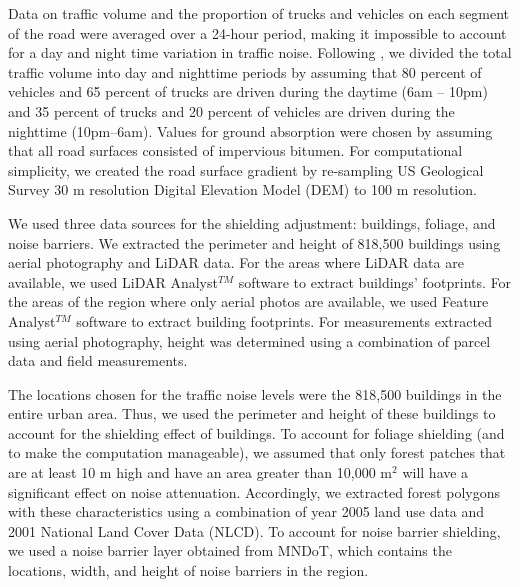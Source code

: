 \documentclass{article}\usepackage{graphicx, color}
\begin{document}
Data on traffic volume and the proportion of trucks and vehicles on each segment of the road were averaged over a 24-hour period, making it impossible to account for a day and night time variation in traffic noise. Following \citet{Arditi2007}, we divided the total traffic volume into day and nighttime periods by assuming that 80 percent of vehicles and 65 percent of trucks are driven during the daytime (6am -- 10pm) and 35 percent of trucks and 20 percent of vehicles are driven during the nighttime (10pm--6am). Values for ground absorption were chosen by assuming that all road surfaces consisted of impervious bitumen. For computational simplicity, we created the road surface gradient by re-sampling US Geological Survey 30 m resolution Digital Elevation Model (DEM) to 100 m resolution. 

We used three data sources for the shielding adjustment: buildings, foliage, and noise barriers. We extracted the perimeter and height of 818,500 buildings using aerial photography and LiDAR data. For the areas where LiDAR data are available, we used LiDAR Analyst$^{TM}$ software to extract buildings’ footprints. For the areas of the region where only aerial photos are available, we used Feature Analyst$^{TM}$ software to extract building footprints. For measurements extracted using aerial photography, height was determined using a combination of parcel data and field measurements. 

The locations chosen for the traffic noise levels were the 818,500 buildings in the entire urban area. Thus, we used the perimeter and height of these buildings to account for the shielding effect of buildings. To account for foliage shielding (and to make the computation manageable), we assumed that only forest patches that are at least 10 m high and have an area greater than 10,000 m$^2$ will have a significant effect on noise attenuation. Accordingly, we extracted forest polygons with these characteristics using a combination of year 2005 land use data and 2001 National Land Cover Data (NLCD). To account for noise barrier shielding, we used a noise barrier layer obtained from MNDoT, which contains the locations, width, and height of noise barriers in the region.
\end{document}
